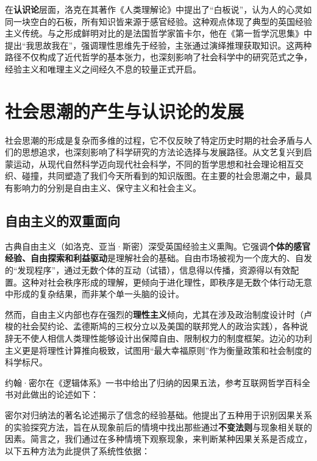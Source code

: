 在\textbf{认识论}层面，洛克在其著作《人类理解论》中提出了“白板说”，认为人的心灵如同一块空白的石板，所有知识皆来源于感官经验。这种观点体现了典型的英国经验主义传统。与之形成鲜明对比的是法国哲学家笛卡尔，他在《第一哲学沉思集》中提出“我思故我在”，强调理性思维先于经验，主张通过演绎推理获取知识。这两种路径不仅构成了近代哲学的基本张力，也深刻影响了社会科学中的研究范式之争，经验主义和唯理主义之间经久不息的较量正式开启。

\section{社会思潮的产生与认识论的发展}

社会思潮的形成是复杂而多维的过程，它不仅反映了特定历史时期的社会矛盾与人们的思想追求，也深刻影响了科学研究的方法论选择与发展路径。从文艺复兴到启蒙运动，从现代自然科学迈向现代社会科学，不同的哲学思想和社会理论相互交织、碰撞，共同塑造了我们今天所看到的知识版图。在主要的社会思潮之中，最具有影响力的分别是自由主义、保守主义和社会主义。

\subsection{自由主义的双重面向}

古典自由主义（如洛克、亚当·斯密）深受英国经验主义熏陶。它强调\textbf{个体的感官经验、自由探索和利益驱动}是理解社会的基础。自由市场被视为一个庞大的、自发的“发现程序”，通过无数个体的互动（试错），信息得以传播，资源得以有效配置。这种对社会秩序形成的理解，更倾向于进化理性，即秩序是无数个体行动无意中形成的复杂结果，而非某个单一头脑的设计。

然而，自由主义内部也存在强烈的\textbf{理性主义}倾向，尤其在涉及政治制度设计时（卢梭的社会契约论、孟德斯鸠的三权分立以及美国的联邦党人的政治实践），各种说辞无不使人相信人类理性能够设计出保障自由、限制权力的制度框架。边沁的功利主义更是将理性计算推向极致，试图用“最大幸福原则”作为衡量政策和社会制度的科学标尺。

约翰·密尔在《逻辑体系》一书中给出了归纳的因果五法，参考互联网哲学百科全书对此做出的论述如下：\textsuperscript{\cite{4}}

密尔对归纳法的著名论述揭示了信念的经验基础。他提出了五种用于识别因果关系的实验探究方法，旨在从现象前后的情境中找出那些通过\textbf{不变法则}与现象相关联的因素。简言之，我们通过在多种情境下观察现象，来判断某种因果关系是否成立，以下五种方法为此提供了系统性依据：

